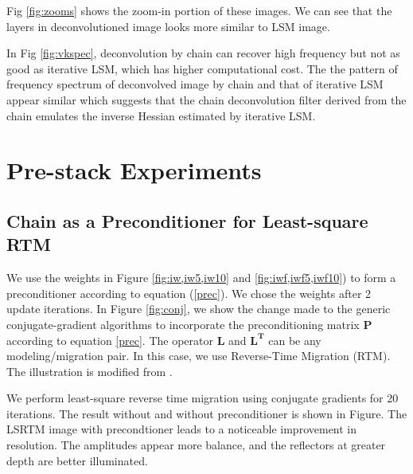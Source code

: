 

Fig \ref{fig:zooms} shows the zoom-in portion of these images. We can see that the layers in deconvolutioned image looks more similar to LSM image.


In Fig \ref{fig:vkspec}, deconvolution by chain can recover high frequency but not as good as iterative LSM, which has higher computational cost. The the pattern of frequency spectrum of deconvolved image by chain and that of iterative LSM appear similar which suggests that the chain deconvolution filter derived from the chain emulates the inverse Hessian estimated by iterative LSM.




%
%
\newpage
\section{Pre-stack Experiments}
\subsection{Chain as a Preconditioner for Least-square RTM}

We use the weights in Figure \ref{fig:iw,iw5,iw10} and \ref{fig:iwf,iwf5,iwf10}) to form a preconditioner according to equation (\ref{prec}). We chose the weights after 2 update iterations. In Figure \ref{fig:conj}, we show the change made to the generic conjugate-gradient algorithms to incorporate the preconditioning matrix $\mathbf{P}$ according to equation \ref{prec}. The operator $\mathbf{L}$ and $\mathbf{L^T}$ can be any modeling/migration pair. In this case, we use Reverse-Time Migration (RTM). The illustration is modified from \cite[]{madagascar}.


We perform least-square reverse time migration using conjugate gradients for 20 iterations. The result without and without preconditioner is shown in Figure. The LSRTM image with precondtioner leads to a noticeable improvement in resolution. The amplitudes appear more balance, and the reflectors at greater depth are better illuminated. 

